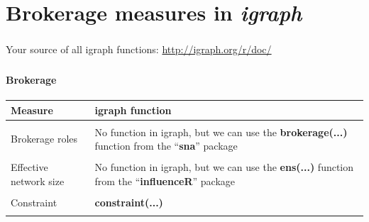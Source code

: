 \documentclass[8pt]{beamer}
\begin{document}
\section{Brokerage measures in \textit{igraph}}

\bgroup
{}
\begin{frame}[plain]{}
\begin{center}
\color{white}{\Huge\insertsection}
\end{center}
\end{frame}
\egroup


\begin{frame}
\frametitle{\insertsection}

Your source of all igraph functions: \url{http://igraph.org/r/doc/}

\end{frame}


\begin{frame}
\frametitle{\insertsection}
\framesubtitle{Brokerage}


\small
\begin{table}
\begin{tabular}{p{3cm}p{7.5cm}}
\toprule
\textbf{Measure}        & \textbf{igraph function} \\
\hline
\\
Brokerage roles         & No function in igraph, but we can use the \textbf{brokerage(...)} function from the ``\textbf{sna}'' package\\
\\
Effective network size  & No function in igraph, but we can use the \textbf{ens(...)} function from the ``\textbf{influenceR}'' package\\
\\
Constraint              & \textbf{constraint(...)}\\
\\

\bottomrule
\end{tabular}
\end{table}
\end{frame}





\end{document}
